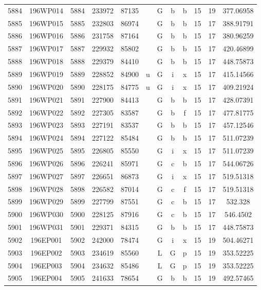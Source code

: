 \begin{tabular}{|*{12}{c|}}
5884 & 196WP014 & 5884 & 233972 & 87135 &  & G & b & b & 15 & 19 & 377.06958 \\ 
5885 & 196WP015 & 5885 & 232803 & 86974 &  & G & b & b & 15 & 17 & 388.91791 \\ 
5886 & 196WP016 & 5886 & 231758 & 87164 &  & G & b & b & 15 & 17 & 380.96259 \\ 
5887 & 196WP017 & 5887 & 229932 & 85802 &  & G & b & b & 15 & 17 & 420.46899 \\ 
5888 & 196WP018 & 5888 & 229379 & 84410 &  & G & b & b & 15 & 17 & 448.75873 \\ 
5889 & 196WP019 & 5889 & 228852 & 84900 & u & G & i & x & 15 & 17 & 415.14566 \\ 
5890 & 196WP020 & 5890 & 228175 & 84775 & u & G & i & x & 15 & 17 & 409.21924 \\ 
5891 & 196WP021 & 5891 & 227900 & 84413 &  & G & b & b & 15 & 17 & 428.07391 \\ 
5892 & 196WP022 & 5892 & 227305 & 83587 &  & G & b & f & 15 & 17 & 477.81775 \\ 
5893 & 196WP023 & 5893 & 227191 & 83537 &  & G & b & b & 15 & 17 & 457.12546 \\ 
5894 & 196WP024 & 5894 & 227122 & 85484 &  & G & b & b & 15 & 17 & 511.07239 \\ 
5895 & 196WP025 & 5895 & 226805 & 85550 &  & G & i & x & 15 & 17 & 511.07239 \\ 
5896 & 196WP026 & 5896 & 226241 & 85971 &  & G & c & b & 15 & 17 & 544.06726 \\ 
5897 & 196WP027 & 5897 & 226651 & 86873 &  & G & i & x & 15 & 17 & 519.51318 \\ 
5898 & 196WP028 & 5898 & 226582 & 87014 &  & G & c & f & 15 & 17 & 519.51318 \\ 
5899 & 196WP029 & 5899 & 227799 & 87551 &  & G & c & b & 15 & 17 & 532.328 \\ 
5900 & 196WP030 & 5900 & 228125 & 87916 &  & G & c & b & 15 & 17 & 546.4502 \\ 
5901 & 196WP031 & 5901 & 229371 & 84315 &  & G & b & b & 15 & 17 & 448.75873 \\ 
5902 & 196EP001 & 5902 & 242000 & 78474 &  & G & i & x & 15 & 19 & 504.46271 \\ 
5903 & 196EP002 & 5903 & 234619 & 85560 &  & L & G & p & 15 & 19 & 353.52225 \\ 
5904 & 196EP003 & 5904 & 234632 & 85486 &  & L & G & p & 15 & 19 & 353.52225 \\ 
5905 & 196EP004 & 5905 & 241633 & 78654 &  & G & b & b & 15 & 19 & 492.57465 \\ 

\end{tabular}
